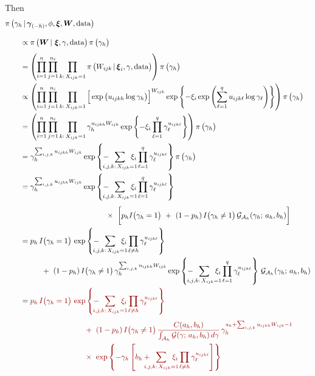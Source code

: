 \documentclass[11pt]{article}
\renewcommand{\vec}{\boldsymbol}
\newcommand{\barS}{\,|\,}
\newcommand{\ind}{I}
\newcommand{\gammaExpr}{ -\hspace{2mm} \sum_{\mathclap{i,j,k{:}\, X_{ijk}=1}} \hspace{2mm} \xi_i \prod_{\ell=1}^q \gamma_\ell^{ u_{ijk\ell} } }
\newcommand{\gammaExprNoH}{ -\hspace{2mm} \sum_{\mathclap{i,j,k{:}\, X_{ijk}=1}} \hspace{2mm} \xi_i \prod_{\ell \ne h} \gamma_\ell^{ u_{ijk\ell} } }
\begin{document}
\begin{enumerate}[label=Step \arabic*., leftmargin=13mm, itemsep=10mm]
Then
\begin{align*} \MoveEqLeft
\pi\, \big( \gamma_h \barS \vec{\gamma}_{(-h)}, \phi, \vec{\xi}, \vec{W}, \text{data} \big) \\[2ex]
& \propto \pi\, \big( \vec{W} \barS\, \vec{\xi}, \gamma, \text{data} \big)\, \pi\,\big( \gamma_h \big) \\[1ex]
&= \left( \prod_{i=1}^{n} \prod_{j=1}^{n_i} \prod_{k{:}\, X_{ijk} = 1} \pi\, \big( W_{ijk} \barS \vec{\xi}_i, \gamma, \text{data} \big) \right) \pi\, \big( \gamma_h \big) \\
&\propto \left( \prod_{i=1}^{n} \prod_{j=1}^{n_i} \prod_{k{:}\, X_{ijk} = 1} \Big[ \exp\big( u_{ijkh} \log \gamma_h \big) \Big]^{W_{ijk}} \exp\left\{ -\xi_i \exp\left( \sum_{\ell=1}^q u_{ijk\ell} \log \gamma_{\ell} \right) \right\} \right) \pi\, \big( \gamma_h \big) \\
&= \left( \prod_{i=1}^{n} \prod_{j=1}^{n_i} \prod_{k{:}\, X_{ijk} = 1} \gamma_h^{ u_{ijkh} W_{ijk} } \exp\left\{ -\xi_i \prod_{\ell=1}^q \gamma_\ell^{ u_{ijk\ell} } \right\} \right) \pi\, \big( \gamma_h \big) \\
&= \gamma_h^{ \sum_{i,j,k} u_{ijkh} W_{ijk} } \exp\left\{ \gammaExpr \right\} \pi\, \big( \gamma_h \big) \\
&= \gamma_h^{ \sum_{i,j,k} u_{ijkh} W_{ijk} } \exp\left\{ \gammaExpr \right\} \\[1ex]
& \hspace{40mm} \times~ \bigg[ p_h \ind\big( \gamma_h = 1 \big) ~+~ (1 - p_h)\, \ind\big( \gamma_h \ne 1 \big)\, \mathcal{G}_{\mathcal{A}_h} (\gamma_h;\, a_h,b_h) \bigg] \\
&= p_h\, \ind\big( \gamma_h = 1 \big)\, \exp\left\{ \gammaExprNoH \right\} \\
& \hspace{10mm} +~ (1 - p_h)\, \ind\big(\gamma_h \ne 1 \big)\, \gamma_h^{ \sum_{i,j,k} u_{ijkh} W_{ijk} } \exp\left\{ \gammaExpr \right\} \, \mathcal{G}_{\mathcal{A}_h} (\gamma_h;\, a_h,b_h) \\
&= \color{QuestCol} p_h\, \ind\big( \gamma_h = 1 \big)\, \exp\left\{ \gammaExprNoH \right\} \\[1ex]
& \color{QuestCol} \hspace{30mm} +~ (1 - p_h)\, \ind\big(\gamma_h \ne 1 \big)\, \frac{ C(a_h,b_h) }{ \int_{\mathcal{A}_h} \mathcal{G}(\gamma;\, a_h,b_h)\, d\gamma }\, \gamma_h^{ a_h + \sum_{i,j,k} u_{ijkh} W_{ijk} - 1 } \\
& \color{QuestCol} \hspace{30mm} \times~ \exp\left\{ -\gamma_h \left[ b_h +\hspace{2mm} \sum_{\mathclap{i,j,k{:}\, X_{ijk}=1}} \hspace{2mm} \xi_i \prod_{\ell \ne h} \gamma_\ell^{ u_{ijk\ell} } \right] \right\} \\[2ex]

\end{align*}
\end{enumerate}
\end{document}
